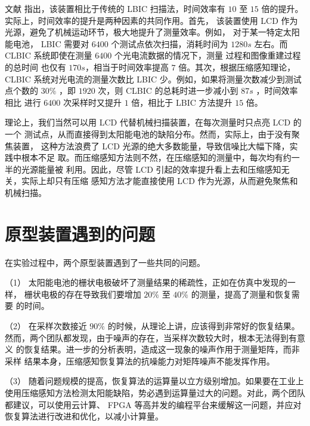文献 \cite{XDUCLBIC} 指出，该装置相比于传统的 LBIC 扫描法，时间效率有
$10$ 至 $15$ 倍的提升。实际上，时间效率的提升是两种因素的共同作用。首先，
该装置使用 LCD 作为光源，避免了机械运动环节，极大地提升了测量效率。例如，
对于某一特定太阳能电池， LBIC 需要对 $6400$ 个测试点依次扫描，消耗时间为
$1280 s$ 左右。而 CLBIC 系统即使在测量 $6400$ 个光电流数据的情况下，测量
过程和图像重建过程的总时间
也仅有 $170 s$，相当于时间效率提高 $7$ 倍。其次，根据压缩感知理论， CLBIC
系统对光电流的测量次数比 LBIC 少。例如，如果将测量次数减少到测试点个数的
$30\%$ ，即 $1920$ 次，则 CLBIC 的总耗时进一步减小到 $87 s$ ，时间效率相比
进行 $6400$ 次采样时又提升 $1$ 倍，相比于 LBIC 方法提升 $15$ 倍。

理论上，我们当然可以用 LCD 代替机械扫描装置，在每次测量时只点亮 LCD 的一个
测试点，从而直接得到太阳能电池的缺陷分布。然而，实际上，由于没有聚焦装置，
这种方法浪费了 LCD 光源的绝大多数能量，导致信噪比大幅下降，实践中根本不足
取。而压缩感知方法则不然，在压缩感知的测量中，每次均有约一半的光源能量被
利用。因此，尽管 LCD 引起的效率提升看上去和压缩感知无关，实际上却只有压缩
感知方法才能直接使用 LCD 作为光源，从而避免聚焦和机械扫描。

\section{原型装置遇到的问题}

在实验过程中，两个原型装置遇到了一些共同的问题。

（1） 太阳能电池的栅状电极破坏了测量结果的稀疏性，正如在仿真中发现的一样，
栅状电极的存在导致我们要增加 $20\%$ 至 $40\%$ 的测量，提高了测量和恢复需要
的时间。

（2） 在采样次数接近 $90\%$ 的时候，从理论上讲，应该得到非常好的恢复结果。
然而，两个团队都发现，由于噪声的存在，当采样次数较大时，根本无法得到有意义
的恢复结果。进一步的分析表明，造成这一现象的噪声作用于测量矩阵，而非采样
结果本身，压缩感知恢复算法的抗噪能力对矩阵噪声不能发挥作用。

（3） 随着问题规模的提高，恢复算法的运算量以立方级别增加。如果要在工业上
使用压缩感知方法检测太阳能缺陷，势必遇到运算量过大的问题。对此，两个团队
都建议，可以使用云计算、 FPGA 等高并发的编程平台来缓解这一问题，并应对
恢复算法进行改进和优化，以减小计算量。
